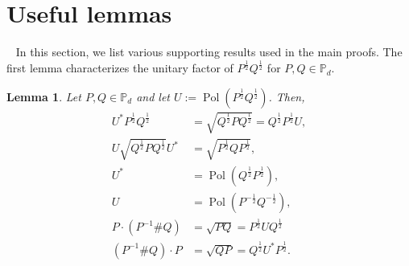 \documentclass[12pt]{article}
\newtheorem{lemma}[theorem]{Lemma}     %
\theoremstyle{definition}
\begin{document}
\section{Useful lemmas}~\label{Sec:UsefulLeamm}
In this section, we list various supporting results used in the main proofs. The first lemma characterizes the unitary factor of $P^{\frac 12} Q^{\frac 12}$ for $P, Q \in \mathbb{P}_d$.

\begin{theorembox}
    \begin{lemma}\label{Lem:PolarFactorLemma}
Let $P, Q \in \mathbb{P}_d$ and let $U := \operatorname{Pol}\left(P^{\frac 12} Q^{\frac 12}\right)$. Then,
\begin{align}
    U^* P^{\frac 12} Q^{\frac 12} &= \sqrt{Q^{\frac 12} P Q^{\frac 12}} = Q^{\frac 12} P^{\frac 12} U, \label{Eq:PolFacLemma1} \\
    U \sqrt{Q^{\frac 12} P Q^{\frac 12}} U^* &= \sqrt{P^{\frac 12} Q P^{\frac 12}}, \label{Eq:PolFacLemma2} \\
    U^* &= \operatorname{Pol}\left(Q^{\frac 12} P^{\frac 12}\right), \\
    U &= \operatorname{Pol}\left(P^{-\frac 12} Q^{-\frac 12}\right), \\
    P \cdot (P^{-1} \# Q) &= \sqrt{PQ} = P^{\frac 12} U Q^{\frac 12} \\  
     (P^{-1} \# Q) \cdot P &= \sqrt{QP} = Q^{\frac 12} U^* P^{\frac 12} .
\end{align}
\end{lemma}
\end{theorembox}
\end{document}
